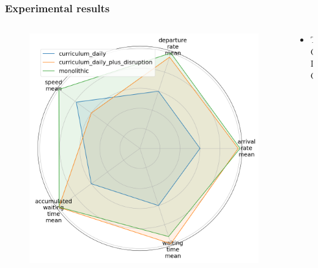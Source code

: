 \documentclass[dvipsnames]{beamer}
\begin{document}
\begin{frame}
\frametitle{Experimental results}
  \begin{columns}
  \begin{column}{0.5\textwidth}
    \begin{figure}
      \centering
      \includegraphics[width=1.0\textwidth]{figures/dataset-radar.png}
    \end{figure}
  \end{column}
  \begin{column}{0.5\textwidth}
    \begin{itemize}
      \item TODO
    \end{itemize}
  \end{column}
\end{columns}
\end{frame}
\end{document}
